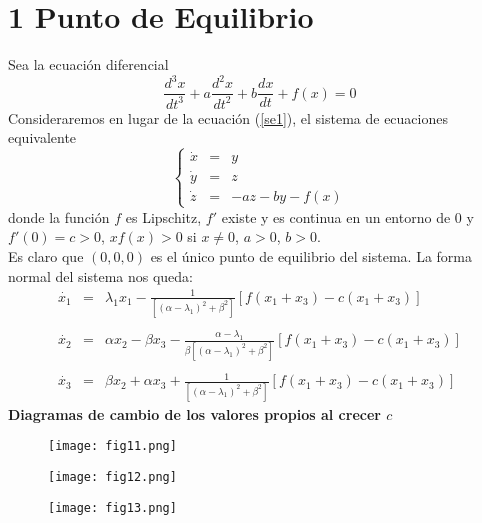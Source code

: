 \documentclass[letter]{article}
\begin{document}
\section{1 Punto de Equilibrio}
  \large
\color{black} Sea  la ecuaci{\'o}n diferencial
\begin{equation}\label{se1}
\frac{d^3x}{dt^3}+a\frac{d^2x}{dt^2}+b\frac{dx}{dt}+f(x)=0
\end{equation}
Consideraremos en lugar de la ecuaci{\'o}n (\ref{se1}), el sistema de
ecuaciones equivalente
\begin{equation}\label{se2}
\left\{\begin{array}{lcl}
\dot{x}&=&y\\
\dot{y}&=&z\\
\dot{z}&=&-az-by-f(x)
\end{array}\right.
\end{equation}
donde la funci{\'o}n $f$ es Lipschitz, $f'$ existe y es continua en un
entorno de 0 y $f'(0)=c>0$, $xf(x)>0$ si $x\neq0$, $a>0$, $b>0$.\\
Es claro que $(0,0,0)$ es el {\'u}nico punto de equilibrio del
sistema.
\newpage
La forma normal del sistema nos queda:
\begin{equation}\label{se7}
\begin{array}{lcl}
\dot{x_1}&=&\lambda_1
x_1-\displaystyle{\frac{1}{[(\alpha-\lambda_1)^2+\beta^2]}}[f(x_1+x_3)-c(x_1+x_3)]\\&&
\\
\dot{x_2}&=&\alpha x_2-\beta
x_3-\displaystyle{\frac{\alpha-\lambda_1}{\beta[(\alpha-\lambda_1)^2+\beta^2]}}[f(x_1+x_3)-c(x_1+x_3)]
\\ &&
\\
\dot{x_3}&=&\beta x_2+\alpha
x_3+\displaystyle{\frac{1}{[(\alpha-\lambda_1)^2+\beta^2]}}[f(x_1+x_3)-c(x_1+x_3)]
\end{array}
\end{equation}
{\bf\large{Diagramas de cambio de los valores propios al crecer
$c$}}
\begin{figure}[h]
\centering
\texttt{[image: fig11.png]}
\end{figure}
\begin{figure}[h]
\centering
\texttt{[image: fig12.png]}
\label{figura2}
\end{figure}
\begin{figure}[h]
\centering
\texttt{[image: fig13.png]}
\label{figura3}
\end{figure}
\end{document}
